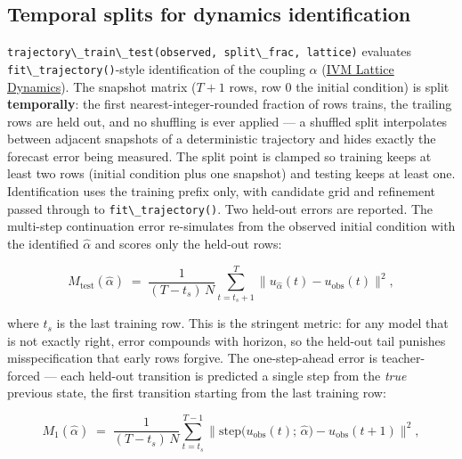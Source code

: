 \documentclass[
  10pt,
]{article}
\newcommand{\passthrough}[1]{#1}
\begin{document}
\subsection{Temporal splits for dynamics
identification}\label{temporal-splits-for-dynamics-identification}

\passthrough{\lstinline!trajectory\_train\_test(observed, split\_frac, lattice)!}
evaluates \passthrough{\lstinline!fit\_trajectory()!}-style
identification of the coupling \(\alpha\) (\href{12_ivm_dynamics.md}{IVM
Lattice Dynamics}). The snapshot matrix (\(T+1\) rows, row 0 the initial
condition) is split \textbf{temporally}: the first
nearest-integer-rounded fraction of rows trains, the trailing rows are
held out, and no shuffling is ever applied --- a shuffled split
interpolates between adjacent snapshots of a deterministic trajectory
and hides exactly the forecast error being measured. The split point is
clamped so training keeps at least two rows (initial condition plus one
snapshot) and testing keeps at least one. Identification uses the
training prefix only, with candidate grid and refinement passed through
to \passthrough{\lstinline!fit\_trajectory()!}. Two held-out errors are
reported. The multi-step continuation error re-simulates from the
observed initial condition with the identified \(\hat{\alpha}\) and
scores only the held-out rows:

\begin{equation}
\label{eq:learn-horizon}
M_{\mathrm{test}}(\hat{\alpha}) \;=\; \frac{1}{(T - t_s)\,N}
\sum_{t=t_s+1}^{T} \big\lVert u_{\hat{\alpha}}(t) - u_{\mathrm{obs}}(t)
\big\rVert^{2} ,
\end{equation}

where \(t_s\) is the last training row. This is the stringent metric:
for any model that is not exactly right, error compounds with horizon,
so the held-out tail punishes misspecification that early rows forgive.
The one-step-ahead error is teacher-forced --- each held-out transition
is predicted a single step from the \emph{true} previous state, the
first transition starting from the last training row:

\begin{equation}
\label{eq:learn-onestep}
M_{1}(\hat{\alpha}) \;=\; \frac{1}{(T - t_s)\,N}
\sum_{t=t_s}^{T-1} \big\lVert
\mathrm{step}\bigl(u_{\mathrm{obs}}(t);\, \hat{\alpha}\bigr)
- u_{\mathrm{obs}}(t+1) \big\rVert^{2},
\end{equation}
\end{document}

